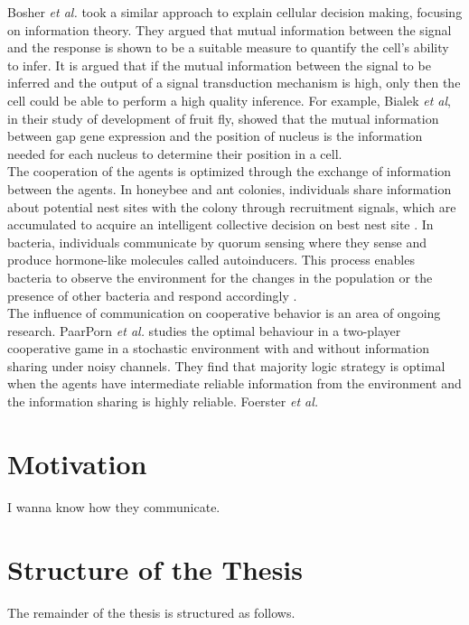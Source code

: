 Bosher \textit{et al.} \cite{Bowsher2014} took a similar approach to explain cellular decision making, focusing on information theory. They argued that mutual information between the signal and the response is shown to be a suitable measure to quantify the cell's ability to infer. It is argued that if the mutual information between the signal to be inferred and the output of a signal transduction mechanism is high, only then the cell could be able to perform a high quality inference. For example, Bialek \textit{et al}, in their study of development of fruit fly, showed that the mutual information between gap gene expression and the position of nucleus is the information needed for each nucleus to determine their position in a cell. \\
The cooperation of the agents is optimized through the exchange of information between the agents. In honeybee and ant colonies, individuals share information about potential nest sites with the colony through recruitment signals, which are accumulated to acquire an intelligent collective decision on best nest site \cite{Franks2002}. In bacteria, individuals communicate by quorum sensing where they sense and produce hormone-like molecules called autoinducers. This process enables bacteria to observe the environment for the changes in the population or the presence of other bacteria and respond accordingly \cite{doi:10.1146/annurev.cellbio.21.012704.131001}.\\
The influence of communication on cooperative behavior is an area of ongoing research. PaarPorn \textit{et al.} \cite{Paarporn2018a} studies the optimal behaviour in a two-player cooperative game in a stochastic environment with and without information sharing under noisy channels. They find that majority logic strategy is optimal when the agents have intermediate reliable information from the environment and the information sharing is highly reliable. 
Foerster \textit{et al.} \cite{Foerster2016}

\section{Motivation}

I wanna know how they communicate.


\section{Structure of the Thesis}
The remainder of the thesis is structured as follows.

